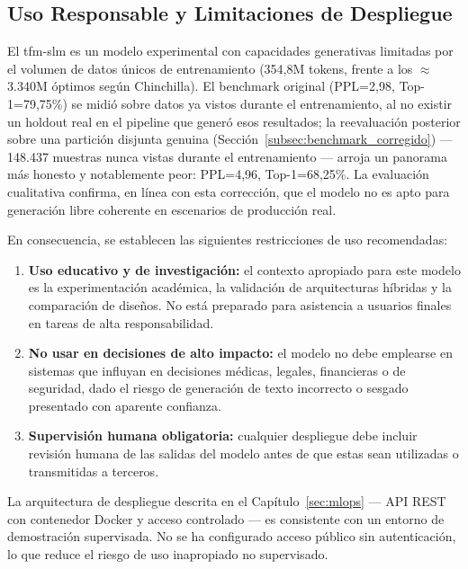 \subsection{Uso Responsable y Limitaciones de Despliegue}

El tfm-slm es un modelo experimental con capacidades generativas limitadas por el volumen de datos únicos de entrenamiento (354,8M tokens, frente a los $\approx$3.340M óptimos según Chinchilla). El benchmark original (PPL=2,98, Top-1=79,75\%) se midió sobre datos ya vistos durante el entrenamiento, al no existir un holdout real en el pipeline que generó esos resultados; la reevaluación posterior sobre una partición disjunta genuina (Sección~\ref{subsec:benchmark_corregido}) --- 148.437 muestras nunca vistas durante el entrenamiento --- arroja un panorama más honesto y notablemente peor: PPL=4,96, Top-1=68,25\%. La evaluación cualitativa confirma, en línea con esta corrección, que el modelo no es apto para generación libre coherente en escenarios de producción real.

En consecuencia, se establecen las siguientes restricciones de uso recomendadas:

\begin{enumerate}
    \item \textbf{Uso educativo y de investigación:} el contexto apropiado para este modelo es la experimentación académica, la validación de arquitecturas híbridas y la comparación de diseños. No está preparado para asistencia a usuarios finales en tareas de alta responsabilidad.
    \item \textbf{No usar en decisiones de alto impacto:} el modelo no debe emplearse en sistemas que influyan en decisiones médicas, legales, financieras o de seguridad, dado el riesgo de generación de texto incorrecto o sesgado presentado con aparente confianza.
    \item \textbf{Supervisión humana obligatoria:} cualquier despliegue debe incluir revisión humana de las salidas del modelo antes de que estas sean utilizadas o transmitidas a terceros.
\end{enumerate}

La arquitectura de despliegue descrita en el Capítulo~\ref{sec:mlops} --- API REST con contenedor Docker y acceso controlado --- es consistente con un entorno de demostración supervisada. No se ha configurado acceso público sin autenticación, lo que reduce el riesgo de uso inapropiado no supervisado.

